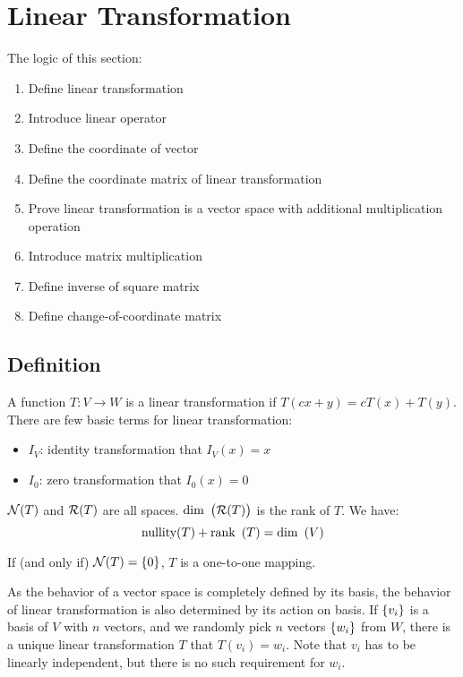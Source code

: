 
\chapter{Linear Transformation}

The logic of this section:
\begin{enumerate}
    \item Define linear transformation
    \item Introduce linear operator
    \item Define the coordinate of vector
    \item Define the coordinate matrix of linear transformation
    \item Prove linear transformation is a vector space with additional multiplication operation
    \item Introduce matrix multiplication
    \item Define inverse of square matrix
    \item Define change-of-coordinate matrix
\end{enumerate}

\section{Definition}
A function $T:V \rightarrow W$ is a linear transformation if $T(cx + y) = cT(x) + T(y)$. There are few basic terms for linear transformation:
\begin{itemize}
    \item $I_V$: identity transformation that $I_V (x) = x$
    \item $I_0$: zero transformation that $I_0 (x) = 0$
\end{itemize}

$\mathcal{N}(T)$ and $\mathcal{R}(T)$ are all spaces. $\displaystyle \mathrm{dim}~\left( \mathcal{R}(T) \right)$ is the rank of $T$. We have:
\begin{equation}
    \text{nullity}(T) + \displaystyle \mathrm{rank}~\left( T \right) = \displaystyle \mathrm{dim}~\left( V \right)
\end{equation}

If (and only if) $\mathcal{N}(T) = \set{0}$, $T$ is a one-to-one mapping.

As the behavior of a vector space is completely defined by its basis, the behavior of linear transformation is also determined by its action on basis. If $\set{v_i}$ is a basis of $V$ with $n$ vectors, and we randomly pick $n$ vectors $\set{w_i}$ from $W$, there is a unique linear transformation $T$ that $T(v_i) = w_i$. Note that $v_i$ has to be linearly independent, but there is no such requirement for $w_i$.


